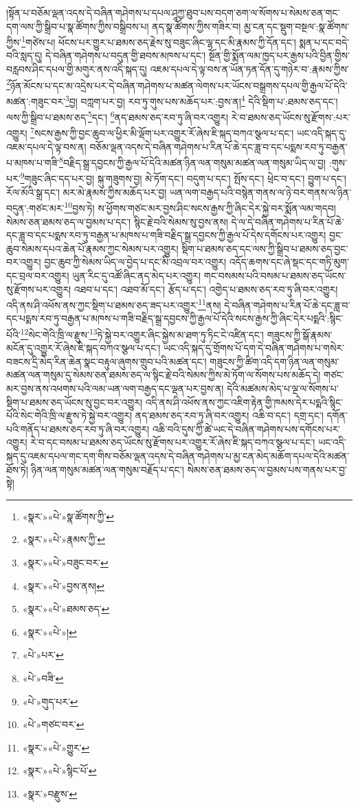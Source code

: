 །སྟོན་པ་བཅོམ་ལྡན་འདས་དེ་བཞིན་གཤེགས་པ་དཔལ་ཤཱཀྱ་ཐུབ་པས་བདག་ཅག་ལ་སོགས་པ་སེམས་ཅན་གང་དག་ལས་ཀྱི་སྒྲིབ་པ་སྣ་ཚོགས་ཀྱིས་བསྒྲིབས་པ། ནད་སྣ་ཚོགས་ཀྱིས་གཟིར་བ། མྱ་ངན་དང་སྡུག་བསྔལ་:སྣ་ཚོགས་ཀྱིས་\footnote{«སྣར་»«པེ་»སྣ་ཚོགས་ཀྱི་}གཙེས་པ། ཕོངས་པར་གྱུར་པ་ཐམས་ཅད་རྗེས་སུ་བཟུང་ཞིང་ལྷ་དང་མི་རྣམས་ཀྱི་དོན་དང་། སྨན་པ་དང་བདེ་བའི་སླད་དུ། དེ་བཞིན་གཤེགས་པ་བདུན་གྱི་ཐབས་མཁས་པ་དང་། སྔོན་གྱི་སྨོན་ལམ་ཁྱད་པར་རྒྱས་པའི་བྱིན་གྱིས་བརླབས་ཤིང་དཔལ་གྱི་མགུར་ནས་འདི་སྐད་དུ། འཇམ་དཔལ་དེ་ལྟ་བས་ན་ཡོན་ཏན་དོན་དུ་གཉེར་བ་:རྣམས་ཀྱིས་\footnote{«སྣར་»«པེ་»རྣམས་ཀྱི་}ཉོན་མོངས་པ་དང་མ་འདྲེས་པར་དེ་བཞིན་གཤེགས་པ་མཚན་ལེགས་པར་ཡོངས་བསྒྲགས་དཔལ་གྱི་རྒྱལ་པོ་དེའི་མཚན་:གཟུང་བར་\footnote{«སྣར་»«པེ་»བཟུང་བར་}བྱ། བཀླག་པར་བྱ། རབ་ཏུ་གུས་པས་མཆོད་པར་:བྱས་ན།\footnote{«སྣར་»«པེ་»བྱས་ནས།} དེའི་སྡིག་པ་:ཐམས་ཅད་དང་། ལས་ཀྱི་སྒྲིབ་པ་ཐམས་ཅད་\footnote{«སྣར་»«པེ་»ཐམས་ཅད་}དང་། \footnote{«སྣར་»«པེ་»།}ནད་ཐམས་ཅད་རབ་ཏུ་ཞི་བར་འགྱུར། རེ་བ་ཐམས་ཅད་ཡོངས་སུ་རྫོགས་:པར་འགྱུར། \footnote{«པེ་»པར་}སངས་རྒྱས་ཀྱི་བྱང་ཆུབ་ལ་ཕྱིར་མི་ལྡོག་པར་འགྱུར་རོ་ཞེས་ཇི་སྐད་བཀའ་སྩལ་པ་དང་། ཡང་འདི་སྐད་དུ་འཇམ་དཔལ་དེ་ལྟ་བས་ན། བཅོམ་ལྡན་འདས་དེ་བཞིན་གཤེགས་པ་རིན་པོ་ཆེ་དང་ཟླ་བ་དང་པདྨས་རབ་ཏུ་བརྒྱན་པ་མཁས་པ་གཟི་\footnote{«པེ་»བཟི་}བརྗིད་སྒྲ་དབྱངས་ཀྱི་རྒྱལ་པོ་དེའི་མཚན་ཉིན་ལན་གསུམ་མཚན་ལན་གསུམ་ཡིད་ལ་བྱ། :གུས་པར་\footnote{«པེ་»གུད་པར་}གཟུང་ཞིང་དད་པར་བྱ། སྐུ་གཟུགས་བྱ། མེ་ཏོག་དང་། བདུག་པ་དང་། སྤོས་དང་། ཕྲེང་བ་དང་། བྱུག་པ་དང་། རོལ་མོའི་སྒྲ་དང་། མར་མེ་རྣམས་ཀྱིས་མཆོད་པར་བྱ། ཡན་ལག་བརྒྱད་པའི་བསྙེན་གནས་ལ་ཉེ་བར་གནས་ལ་ཉིན་བདུན་:གཙང་མར་\footnote{«པེ་»གཙང་བར་}བྱས་ཏེ། ས་ཕྱོགས་གཙང་མར་བྱས་ཤིང་སངས་རྒྱས་ཀྱི་ཞིང་དེར་སྐྱེ་བར་སྨོན་ལམ་གདབ། སེམས་ཅན་ཐམས་ཅད་ལ་བྱམས་པ་དང་། སྙིང་རྗེ་བའི་སེམས་སུ་བྱས་ནས། དེ་ལ་དེ་བཞིན་གཤེགས་པ་རིན་པོ་ཆེ་དང་ཟླ་བ་དང་པདྨས་རབ་ཏུ་བརྒྱན་པ་མཁས་པ་གཟི་བརྗིད་སྒྲ་དབྱངས་ཀྱི་རྒྱལ་པོ་དེས་དགོངས་པར་འགྱུར། བྱང་ཆུབ་སེམས་དཔའ་ཆེན་པོ་རྣམས་ཀྱང་སེམས་པར་འགྱུར། སྡིག་པ་ཐམས་ཅད་དང་ལས་ཀྱི་སྒྲིབ་པ་ཐམས་ཅད་བྱང་བར་འགྱུར། བྱང་ཆུབ་ཀྱི་སེམས་ཡིད་ལ་བྱེད་པ་དང་མི་འབྲལ་བར་འགྱུར། འདོད་ཆགས་དང་ཞེ་སྡང་དང་གཏི་མུག་དང་བྲལ་བར་འགྱུར། ཡུན་རིང་དུ་འཚོ་ཞིང་ནད་མེད་པར་འགྱུར། གང་བསམས་པའི་བསམ་པ་ཐམས་ཅད་ཡོངས་སུ་རྫོགས་པར་འགྱུར། འཐབ་པ་དང་། འཐབ་མོ་དང་། རྩོད་པ་དང་། འགྱེད་པ་ཐམས་ཅད་རབ་ཏུ་ཞི་བར་འགྱུར། འདི་ནས་ཤི་འཕོས་ནས་ཀྱང་སྡིག་པ་ཐམས་ཅད་ཟད་པར་འགྱུར་\footnote{«སྣར་»«པེ་»གྱུར་}ནས། དེ་བཞིན་གཤེགས་པ་རིན་པོ་ཆེ་དང་ཟླ་བ་དང་པདྨས་རབ་ཏུ་བརྒྱན་པ་མཁས་པ་གཟི་བརྗིད་སྒྲ་དབྱངས་ཀྱི་རྒྱལ་པོ་དེའི་སངས་རྒྱས་ཀྱི་ཞིང་དེར་པདྨའི་:སྙིང་པོའི་\footnote{«སྣར་»«པེ་»སྙིང་པོ་}སེང་གེའི་ཁྲི་ལ་རྫུས་\footnote{«སྣར་»བརྫུས་}ཏེ་སྐྱེ་བར་འགྱུར་ཞིང་སྐྱེས་མ་ཐག་ཏུ་ཏིང་ངེ་འཛིན་དང་། གཟུངས་ཀྱི་སྒོ་རྣམས་མངོན་དུ་འགྱུར་རོ་ཞེས་ཇི་སྐད་བཀའ་སྩལ་པ་དང་། ཡང་འདི་སྐད་དུ་གྲོགས་པོ་དག་དེ་བཞིན་གཤེགས་པ་གསེར་བཟངས་དྲི་མེད་རིན་ཆེན་སྣང་བརྟུལ་ཞུགས་གྲུབ་པའི་མཚན་དང་། གཟུངས་ཀྱི་ཚིག་འདི་དག་ཉིན་ལན་གསུམ་མཚན་ལན་གསུམ་དུ་སེམས་ཅན་ཐམས་ཅད་ལ་སྙིང་རྗེ་བའི་སེམས་ཀྱིས་མེ་ཏོག་ལ་སོགས་པས་མཆོད་དེ། གཙང་མར་བྱས་ནས་འཕགས་པའི་ལམ་ཡན་ལག་བརྒྱད་དང་ལྡན་པར་བྱས་ན། དེའི་མཚམས་མེད་པ་ལྔ་ལ་སོགས་པ་སྡིག་པ་ཐམས་ཅད་ཡོངས་སུ་བྱང་བར་འགྱུར། འདི་ནས་ཤི་འཕོས་ནས་ཀྱང་འཇིག་རྟེན་གྱི་ཁམས་དེར་པདྨའི་སྙིང་པོའི་སེང་གེའི་ཁྲི་ལ་རྫུས་ཏེ་སྐྱེ་བར་འགྱུར། ནད་ཐམས་ཅད་རབ་ཏུ་ཞི་བར་འགྱུར། འཆི་བ་དང་། དགྲ་དང་། དགོན་པའི་གནོད་པ་ཐམས་ཅད་རབ་ཏུ་ཞི་བར་འགྱུར། འཆི་བའི་དུས་ཀྱི་ཚེ་ཡང་དེ་བཞིན་གཤེགས་པས་དགོངས་པར་འགྱུར། རེ་བ་དང་བསམ་པ་ཐམས་ཅད་ཡོངས་སུ་རྫོགས་པར་འགྱུར་རོ་ཞེས་ཇི་སྐད་བཀའ་སྩལ་པ་དང་། ཡང་འདི་སྐད་དུ་འཇམ་དཔལ་གང་དག་གིས་བཅོམ་ལྡན་འདས་དེ་བཞིན་གཤེགས་པ་མྱ་ངན་མེད་མཆོག་དཔལ་དེའི་མཚན་ཐོས་ཏེ། ཉིན་ལན་གསུམ་མཚན་ལན་གསུམ་བརྗོད་པ་དང་། སེམས་ཅན་ཐམས་ཅད་ལ་བྱམས་པས་གནས་པར་བྱ་སྟེ། 